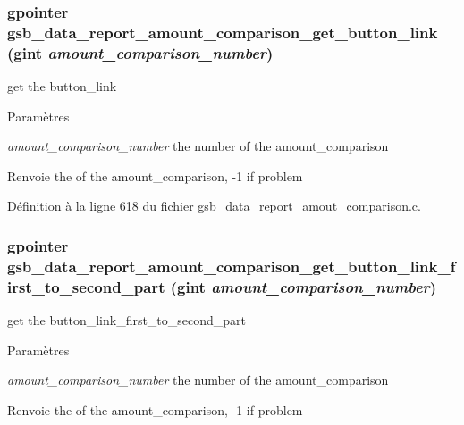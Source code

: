 \subsubsection[{gsb\_\-data\_\-report\_\-amount\_\-comparison\_\-get\_\-button\_\-link}]{\setlength{\rightskip}{0pt plus 5cm}gpointer gsb\_\-data\_\-report\_\-amount\_\-comparison\_\-get\_\-button\_\-link (gint {\em amount\_\-comparison\_\-number})}\label{gsb__data__report__amout__comparison_8h_a3df5f1bbd7f70036d8c5614ae41e2bba}
get the button\_\-link


\begin{DoxyParams}{Paramètres}
\item[{\em amount\_\-comparison\_\-number}]the number of the amount\_\-comparison\end{DoxyParams}
\begin{DoxyReturn}{Renvoie}
the of the amount\_\-comparison, -\/1 if problem 
\end{DoxyReturn}


Définition à la ligne 618 du fichier gsb\_\-data\_\-report\_\-amout\_\-comparison.c.

\subsubsection[{gsb\_\-data\_\-report\_\-amount\_\-comparison\_\-get\_\-button\_\-link\_\-first\_\-to\_\-second\_\-part}]{\setlength{\rightskip}{0pt plus 5cm}gpointer gsb\_\-data\_\-report\_\-amount\_\-comparison\_\-get\_\-button\_\-link\_\-first\_\-to\_\-second\_\-part (gint {\em amount\_\-comparison\_\-number})}\label{gsb__data__report__amout__comparison_8h_a21371b634e4c92ceef60b4ff32d288c5}
get the button\_\-link\_\-first\_\-to\_\-second\_\-part


\begin{DoxyParams}{Paramètres}
\item[{\em amount\_\-comparison\_\-number}]the number of the amount\_\-comparison\end{DoxyParams}
\begin{DoxyReturn}{Renvoie}
the of the amount\_\-comparison, -\/1 if problem 
\end{DoxyReturn}


